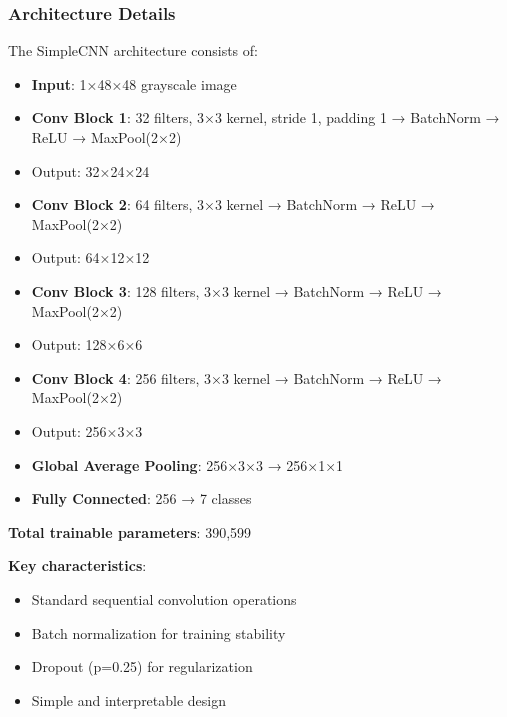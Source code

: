 \documentclass[12pt,a4paper]{article}
\begin{document}
\subsubsection{Architecture Details}
The SimpleCNN architecture consists of:
\begin{itemize}[leftmargin=*]
    \item \textbf{Input}: 1×48×48 grayscale image
    \item \textbf{Conv Block 1}: 32 filters, 3×3 kernel, stride 1, padding 1 → BatchNorm → ReLU → MaxPool(2×2)
    \item Output: 32×24×24
    \item \textbf{Conv Block 2}: 64 filters, 3×3 kernel → BatchNorm → ReLU → MaxPool(2×2)
    \item Output: 64×12×12
    \item \textbf{Conv Block 3}: 128 filters, 3×3 kernel → BatchNorm → ReLU → MaxPool(2×2)
    \item Output: 128×6×6
    \item \textbf{Conv Block 4}: 256 filters, 3×3 kernel → BatchNorm → ReLU → MaxPool(2×2)
    \item Output: 256×3×3
    \item \textbf{Global Average Pooling}: 256×3×3 → 256×1×1
    \item \textbf{Fully Connected}: 256 → 7 classes
\end{itemize}

\textbf{Total trainable parameters}: 390,599

\textbf{Key characteristics}:
\begin{itemize}[leftmargin=*]
    \item Standard sequential convolution operations
    \item Batch normalization for training stability
    \item Dropout (p=0.25) for regularization
    \item Simple and interpretable design
\end{itemize}
\end{document}
